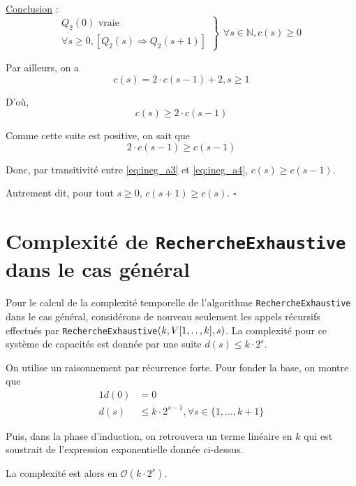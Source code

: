 \documentclass[12pt,a4paper]{article}
\newcommand{\tdots}{\mathinner {\ldotp \ldotp}}
\begin{document}
\begin{appendices}
\medskip
\underline{Conclusion} : 
\begin{equation*}
\left .\begin{array}{l}
Q_{2}(0) \text{ vraie } \\
\forall s \geq 0, [Q_{2}(s) \Rightarrow Q_{2}(s+1) ]
\end{array} \right \}
\left .\begin{array}{l}
\forall s \in \mathbb{N}, c(s) \geq 0
\end{array}\right .
\end{equation*}

\bigskip
Par ailleurs, on a 
\begin{equation*}
   c(s) = 2\cdot c(s-1) + 2, s \geq 1
\end{equation*}

D'o\`u,
\begin{equation}
   c(s) \geq 2\cdot c(s-1) \label{eq:ineg_a3}
\end{equation}

Comme cette suite est positive, on sait que 
\begin{equation}
   2\cdot c(s-1) \geq c(s-1) \label{eq:ineg_a4}
\end{equation}

Donc, par transitivit\'e entre \eqref{eq:ineg_a3} et \eqref{eq:ineg_a4}, $c(s) \geq c(s-1)$.

Autrement dit, pour tout $s \geq 0$, $c(s+1) \geq c(s)$. \hfill\ensuremath{\square}

\newpage
\section{Complexit\'e de \texttt{RechercheExhaustive} dans le cas g\'en\'eral}
\label{appendix:rech_gen}
Pour le calcul de la complexit\'e temporelle de l'algorithme \texttt{RechercheExhaustive} dans le cas g\'en\'eral, consid\'erons de nouveau seulement les appels r\'ecursifs effectu\'es par \texttt{RechercheExhaustive}$(k,V[1,\tdots,k],s)$.
La complexit\'e pour ce syst\`eme de capacit\'es est donn\'ee par une suite $d(s) \leq k\cdot 2^s$. 

On utilise un raisonnement par r\'ecurrence forte. Pour fonder la base, on montre que
\begin{alignat*}{1}
    d(0) &= 0 \\
   d(s) &\leq k\cdot 2^{s-1}, \forall s \in \{1, \dotsc, k+1 \}
\end{alignat*}

Puis, dans la phase d'induction, on retrouvera un terme lin\'eaire en $k$ qui est soustrait de l'expression exponentielle donn\'ee ci-dessus.

La complexit\'e est alors en $\mathcal{O}(k\cdot 2^s)$.

\end{appendices}
	
\printindex
\end{document}
